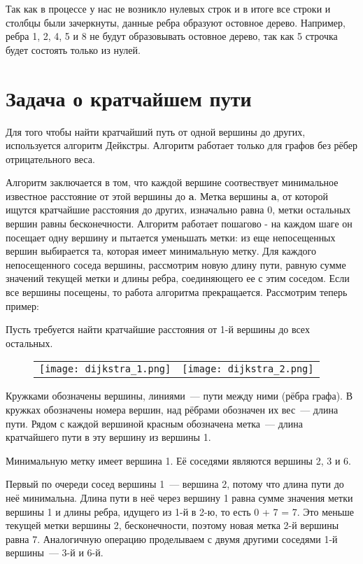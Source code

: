 Так как в процессе у нас не возникло нулевых строк и в итоге все строки и столбцы 
были зачеркнуты, данные ребра образуют остовное дерево.
Например, ребра 1, 2, 4, 5 и 8 не будут образовывать остовное дерево, так как 5
строчка будет состоять только из нулей.

\section{Задача о кратчайшем пути}
Для того чтобы найти кратчайший путь от одной вершины до других, используется алгоритм Дейкстры.
Алгоритм работает только для графов без рёбер отрицательного веса.

Алгоритм заключается в том, что каждой вершине соотвествует минимальное известное расстояние от
этой вершины до \textbf{a}. Метка вершины \textbf{a}, от которой ищутся кратчайшие расстояния до других, изначально равна 0, метки
остальных вершин равны бесконечности. Алгоритм работает пошагово - на каждом шаге он посещает одну вершину
и пытается уменьшать метки: из еще непосещенных вершин выбирается та, которая имеет
минимальную метку. Для каждого непосещенного соседа вершины, рассмотрим новую длину пути,
равную сумме значений текущей метки и длины ребра, соединяющего ее с этим соседом.
Если все вершины посещены, то работа алгоритма прекращается. Рассмотрим теперь пример:

\hspace{3mm}

Пусть требуется найти кратчайшие расстояния от 1-й вершины до всех остальных. 

\begin{figure}[!h]
    \centering
    \begin{tabular}{cc}
        \texttt{[image: dijkstra\_1.png]} & \texttt{[image: dijkstra\_2.png]}
    \end{tabular}
\end{figure}

Кружками обозначены вершины, линиями — пути между ними (рёбра графа).
В кружках обозначены номера вершин, над рёбрами обозначен их вес — длина пути.
Рядом с каждой вершиной красным обозначена метка — длина кратчайшего пути в эту вершину из вершины 1. 

Минимальную метку имеет вершина 1. Её соседями являются вершины 2, 3 и 6.

Первый по очереди сосед вершины 1 — вершина 2, потому что длина пути до неё минимальна.
Длина пути в неё через вершину 1 равна сумме значения метки вершины 1 и длины ребра, идущего из 1-й в 2-ю, то есть 0 + 7 = 7.
Это меньше текущей метки вершины 2, бесконечности, поэтому новая метка 2-й вершины равна 7.
Аналогичную операцию проделываем с двумя другими соседями 1-й вершины — 3-й и 6-й.


